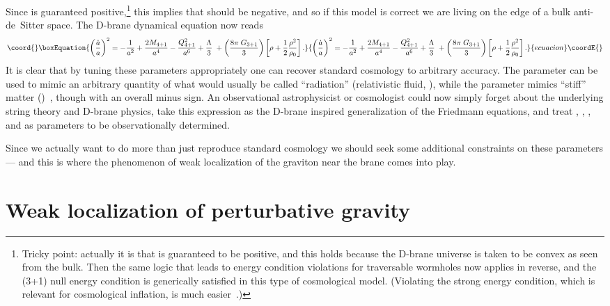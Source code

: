 \documentclass[a4paper,12pt]{article}
\begin{document}
Since \coordHE{} is guaranteed positive,\footnote{
Tricky point: actually it is \coordHE{} that is guaranteed to be
positive, and this holds because the D-brane universe is taken to be
convex as seen from the bulk. Then the same logic that leads to energy
condition violations for traversable wormholes now applies in reverse,
and the (3+1) null energy condition is generically satisfied in this
type of cosmological model. (Violating the strong energy condition,
which is relevant for cosmological inflation, is much
easier~\cite{Science}.)}
this implies that \coordHE{} should be negative, and so if this
model is correct we are living on the edge of a bulk anti-de~Sitter
space. The D-brane dynamical equation now reads
%
\begin{equation}\coord{}\boxEquation{
\left({\dot a \over a}\right)^2 = 
- {1\over a^2} 
+ {2M_{4+1}\over a^4} 
-  {Q_{4+1}^2\over a^6} 
+ {\Lambda\over 3}\;
+\left({ 8\pi \; G_{3+1}\over3}\right) 
\left[\rho + \half {\rho^2\over\rho_0} \right]. 
}{
\left({\dot a \over a}\right)^2 = 
- {1\over a^2} 
+ {2M_{4+1}\over a^4} 
-  {Q_{4+1}^2\over a^6} 
+ {\Lambda\over 3}\;
+\left({ 8\pi \; G_{3+1}\over3}\right) 
\left[\rho + \half {\rho^2\over\rho_0} \right]. 
}{ecuacion}\coordE{}\end{equation}
%
It is clear that by tuning these parameters appropriately one can
recover standard cosmology to arbitrary accuracy. The \coordHE{}
parameter can be used to mimic an arbitrary quantity of what would
usually be called ``radiation'' (relativistic fluid, \coordHE{}), while
the \coordHE{} parameter mimics ``stiff'' matter
(\coordHE{})~\cite{Science}, though with an overall minus sign. An
observational astrophysicist or cosmologist could now simply forget
about the underlying string theory and D-brane physics, take this
expression as the D-brane inspired generalization of the Friedmann
equations, and treat \coordHE{}, \coordHE{}, \myHighlight{$\Lambda$}\coordHE{}, and \coordHE{} as
parameters to be observationally determined.

Since we actually want to do more than just reproduce standard
cosmology we should seek some additional constraints on these
parameters --- and this is where the phenomenon of weak localization
of the graviton near the brane comes into play.


\section{Weak localization of perturbative gravity}
\label{S:weak}
\end{document}

